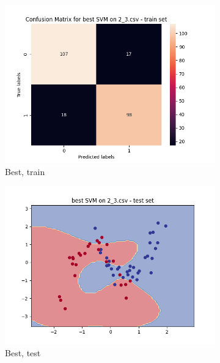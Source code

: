 \documentclass[12pt]{article}
\newcommand*{\subfigwidth}{0.24\textwidth}
\begin{document}
\begin{figure}[H]
\begin{subfigure}[t]{\subfigwidth}
        \includegraphics[width=\linewidth]{img/exp_2/svm/2_3/best/train_matrix.png}
        \caption{Best, train}
    \end{subfigure}
    \hfill
    \begin{subfigure}[t]{\subfigwidth}
        \includegraphics[width=\linewidth]{img/exp_2/svm/2_3/best/test_boundary.png}
        \caption{Best, test}
    \end{subfigure}
    \hfill
    \begin{subfigure}[t]{\subfigwidth}

\end{subfigure}
\end{figure}
\end{document}

